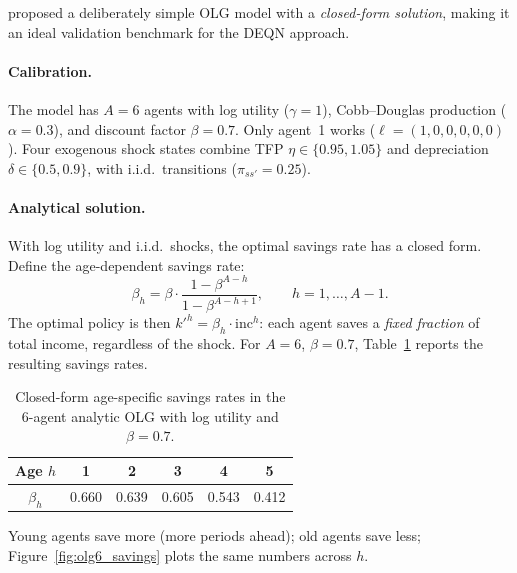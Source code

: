 \documentclass[11pt,a4paper]{report}
\begin{document}
\citet{Krueger20041411} proposed a deliberately simple OLG model with a \emph{closed-form solution}, making it an ideal validation benchmark for the DEQN approach.

\paragraph{Calibration.}
The model has $A=6$ agents with log utility ($\gamma = 1$), Cobb--Douglas production ($\alpha = 0.3$), and discount factor $\beta = 0.7$.  Only agent~1 works ($\ell = (1,0,0,0,0,0)$).  Four exogenous shock states combine TFP $\eta \in \{0.95,1.05\}$ and depreciation $\delta \in \{0.5,0.9\}$, with i.i.d.\ transitions ($\pi_{ss'} = 0.25$).

\paragraph{Analytical solution.}
With log utility and i.i.d.\ shocks, the optimal savings rate has a closed form.  Define the age-dependent savings rate:
\begin{equation}
\beta_h = \beta \cdot \frac{1 - \beta^{A-h}}{1 - \beta^{A-h+1}}, \qquad h = 1, \ldots, A-1.
\label{eq:olg_savings_rate}
\end{equation}
The optimal policy is then $k'^h = \beta_h \cdot \mathrm{inc}^h$: each agent saves a \emph{fixed fraction} of total income, regardless of the shock.  For $A=6$, $\beta=0.7$, Table~\ref{tab:olg6_savings_rates} reports the resulting savings rates.
\begin{table}[ht]
\centering
\small
\begin{tabular}{cccccc}
\toprule
Age $h$ & 1 & 2 & 3 & 4 & 5 \\
\midrule
$\beta_h$ & 0.660 & 0.639 & 0.605 & 0.543 & 0.412 \\
\bottomrule
\end{tabular}
\caption{Closed-form age-specific savings rates in the 6-agent analytic OLG with log utility and $\beta=0.7$.}
\label{tab:olg6_savings_rates}
\end{table}
Young agents save more (more periods ahead); old agents save less; Figure~\ref{fig:olg6_savings} plots the same numbers across $h$.
\end{document}
